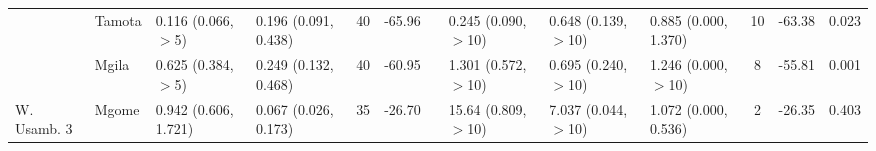 \begin{tabular}{llllclllllclr}
            & Tamota         & 0.116 (0.066, $>$5)    & 0.196 (0.091, 0.438)   & 40   & -65.96   & & 0.245 (0.090, $>$10)   & 0.648 (0.139, $>$10)   & 0.885 (0.000, 1.370)   & 10   & -63.38   & 0.023\\
            & Mgila          & 0.625 (0.384, $>$5)    & 0.249 (0.132, 0.468)   & 40   & -60.95   & & 1.301 (0.572, $>$10)   & 0.695 (0.240, $>$10)   & 1.246 (0.000, $>$10)   & 8    & -55.81   & 0.001\\
\cmidrule{2-13}
W. Usamb. 3 & Mgome          & 0.942 (0.606, 1.721)   & 0.067 (0.026, 0.173)   & 35   & -26.70   & & 15.64 (0.809, $>$10)   & 7.037 (0.044, $>$10)   & 1.072 (0.000, 0.536)   & 2    & -26.35   & 0.403\\
\bottomrule
\end{tabular}